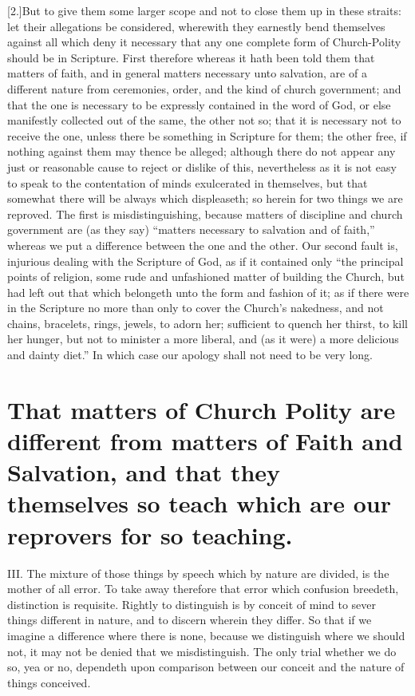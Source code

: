 [2.]But to give them some larger scope and not to close them up in these straits: let their allegations be considered, wherewith they earnestly bend themselves against all which deny it necessary that any one complete form of Church-Polity should be in Scripture. First therefore whereas it hath been told them that matters of faith, and in general matters necessary unto salvation, are of a different nature from ceremonies, order, and the kind of church government; and that the one is necessary to be expressly contained in the word of God, or else manifestly collected out of the same, the other not so; that it is necessary not to receive the one, unless there be something in Scripture for them; the other free, if nothing against them may thence be alleged; although there do not appear any just or reasonable cause to reject  or dislike of this, nevertheless as it is not easy to speak to the contentation of minds exulcerated in themselves, but that somewhat there will be always which displeaseth; so herein for two things we are reproved. The first is misdistinguishing, because matters of discipline and church government are (as they say) “matters necessary to salvation and of faith,” whereas we put a difference between the one and the other. Our second fault is, injurious dealing with the Scripture of God, as if it contained only “the principal points of religion, some rude and unfashioned matter of building the Church, but had left out that which belongeth unto the form and fashion of it; as if there were in the Scripture no more than only to cover the Church’s nakedness, and not chains, bracelets, rings, jewels, to adorn her; sufficient to quench her thirst, to kill her hunger, but not to minister a more liberal, and (as it were) a more delicious and dainty diet.” In which case our apology shall not need to be very long.

\section*{That matters of Church Polity are different from matters of Faith and Salvation, and that they themselves so teach which are our reprovers for so teaching.}

III. The mixture of those things by speech which by nature are divided, is the mother of all error. To take away therefore that error which confusion breedeth, distinction is requisite. Rightly to distinguish is by conceit of mind to sever things different in nature, and to discern wherein they differ. So that if we imagine a difference where there is none, because we distinguish where we should not, it may not be denied that we misdistinguish. The only trial whether we do so, yea or no, dependeth upon comparison between our conceit and the nature of things conceived.

